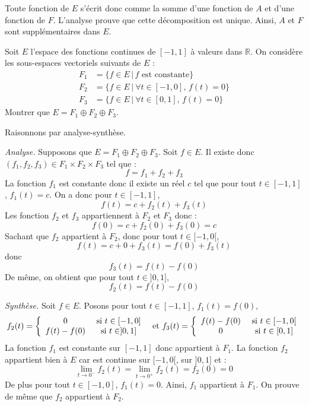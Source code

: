 \documentclass[a4paper,10pt]{report}
\begin{document}
\medskip

\noindent Toute fonction de $E$ s'écrit donc comme la somme d'une fonction de $A$ et d'une fonction de $F$. L'analyse prouve que cette décomposition est unique. Ainsi, $A$ et $F$ sont supplémentaires dans $E$.

\medskip



\begin{Exa} Soit $E$ l'espace des fonctions continues de $[-1,1]$ à valeurs dans $\mathbb{R}$. On considère les sous-espaces vectoriels suivants de $E$ :
\begin{align*}
F_1 &= \lbrace f \in E \, \vert \, f{\text{~est constante}} \rbrace \\
F_2 &= \lbrace f \in E \, \vert \ \forall t \in [ - 1,0], \,  f(t)  = 0 \rbrace \\
F_3 & = \lbrace f \in E \, \vert \ \forall t \in [0,1], \,  f(t) = 0 \rbrace 
\end{align*}
Montrer que $E = F_1 \oplus F_2 \oplus F_3$.
\end{Exa} 

\corr Raisonnons par analyse-synthèse.

\medskip

\noindent \textit{Analyse.} Supposons que $E = F_1 \oplus F_2 \oplus F_3$. Soit $f \in E$. Il existe donc $(f_1,f_2,f_3) \in F_1 \times F_2 \times F_3$ tel que :
$$ f = f_1+ f_2+ f_3$$
La fonction $f_1$ est constante donc il existe un réel $c$ tel que pour tout $t \in [-1,1]$, $f_1(t)=c$. On a donc pour $t \in [-1,1]$,
$$ f(t) = c + f_2(t) + f_3(t)$$
Les fonction $f_2$ et $f_3$ appartiennent à $F_2$ et $F_3$ donc :
$$ f(0) = c + f_2(0)+ f_3(0) = c$$
Sachant que $f_2$ appartient à $F_2$, donc pour tout $t \in [-1,0[$,
$$f(t) = c + 0 + f_3(t) = f(0)+ f_3(t)$$
donc 
$$ f_3(t) = f(t)- f(0)$$
De même, on obtient que pour tout $t \in ]0,1]$,
$$ f_2(t) = f(t)-f(0)$$

\medskip

\noindent \textit{Synthèse.} Soit $f \in E$. Posons pour tout $t \in [-1,1]$, $f_1(t) = f(0)$, 
$$ f_2(t) = \left\lbrace \begin{array}{ccl}
0 & \hbox{ si } t \in [-1,0] \\
f(t)-f(0) & \hbox{ si } t \in ]0,1]
\end{array}\right. \; \hbox{ et } f_3(t) = \left\lbrace \begin{array}{ccl}
f(t)-f(0) & \hbox{ si } t \in [-1,0[ \\
0 & \hbox{ si } t \in [0,1]
\end{array}\right.$$
La fonction $f_1$ est constante sur $[-1,1]$ donc appartient à $F_1$. La fonction $f_2$ appartient bien à $E$ car est continue sur $[-1,0[$, sur $]0,1]$ et :
$$ \lim_{t \rightarrow 0^{-}} f_2(t) =  \lim_{t \rightarrow 0^{+}} f_2(t) = f_2(0) = 0$$
De plus pour tout $t \in [-1,0]$, $f_1(t)=0$. Ainsi, $f_1$ appartient à $F_1$. On prouve de même que $f_2$ appartient à $F_2$. 
\end{document}
